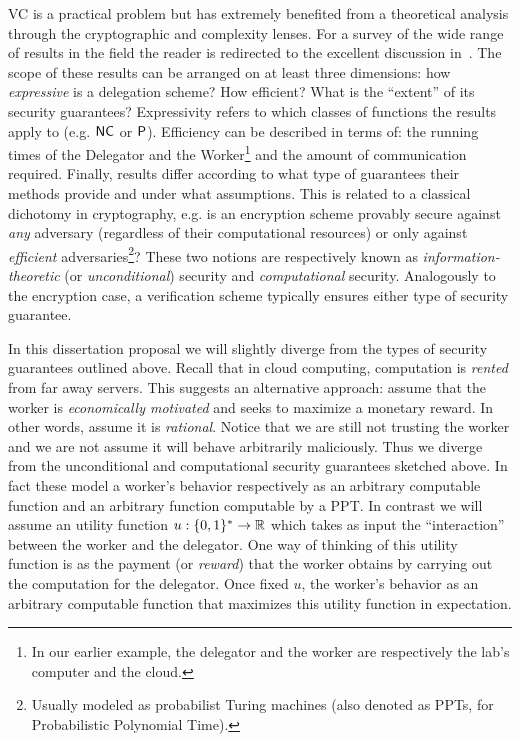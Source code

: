 VC is a practical problem but has extremely benefited from a theoretical analysis through the cryptographic and complexity lenses. For a survey of the wide range of results in the field the reader is redirected to the excellent discussion in~\cite{wb15}. %
 The scope of these results can be arranged on at least three dimensions: how \textit{expressive} is a delegation scheme? How   efficient? What is the ``extent'' of its security guarantees?
 Expressivity refers to which classes of functions the results apply to (e.g. $\NC$ or $\P$).
 Efficiency can be described in terms of: the running times of the Delegator and the Worker\footnote{In our earlier example, the delegator and the worker are respectively the lab's computer and the cloud.} and the amount of communication required. Finally, results differ according to what type of guarantees their methods provide and under what assumptions. This is related to a classical dichotomy in cryptography, e.g. is an encryption scheme provably secure against \textit{any} adversary (regardless of their computational resources) or only against \textit{efficient} adversaries\footnote{Usually modeled as probabilist Turing machines (also denoted as PPTs, for Probabilistic Polynomial Time).}? These two notions are respectively known as \textit{information-theoretic} (or \textit{unconditional}) security and \textit{computational} security. Analogously to the encryption case, a verification scheme typically ensures either type of security guarantee. 

In this dissertation proposal we will slightly diverge from the types of security guarantees outlined above. Recall that in cloud computing, computation is \textit{rented} from far away servers. This suggests an alternative approach: assume that the worker is \textit{economically motivated} and seeks to maximize a monetary reward. In other words, assume it is \textit{rational}. Notice that we are still not trusting the worker and we are not assume it will behave arbitrarily maliciously. Thus we diverge from the unconditional and computational security guarantees sketched above. In fact these model a worker's behavior respectively as an arbitrary computable function and an arbitrary function computable by a PPT. In contrast we will assume an utility function $u: \bits \to \reals$ which takes as input the ``interaction'' between the worker and the delegator. One way of thinking of this utility function is as the payment (or \textit{reward}) that the worker obtains by carrying out the computation for the delegator. Once fixed $u$, the worker's behavior as an arbitrary computable function that maximizes this utility function in expectation.


